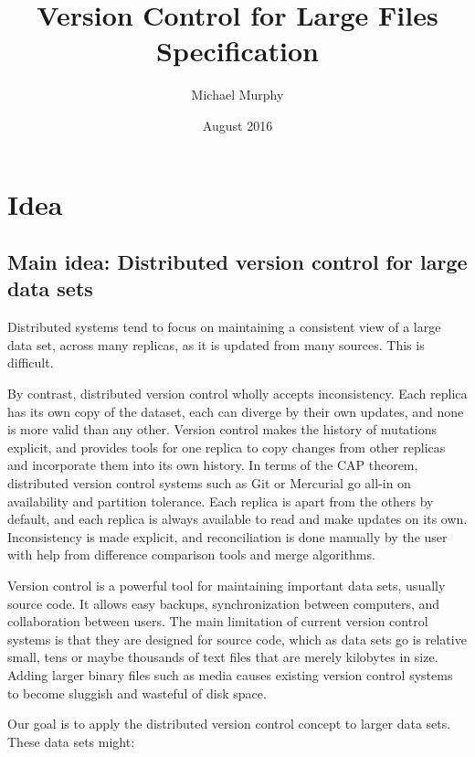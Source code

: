 \documentclass[a4paper]{article}
\begin{document}
\title{Version Control for Large Files\\
    Specification}
\author{Michael Murphy}
\date{August 2016}
\maketitle

\section{Idea}\label{idea}

\subsection{Main idea: Distributed version control for large data
sets}\label{main-idea-distributed-version-control-for-large-data-sets}

Distributed systems tend to focus on maintaining a consistent view of a large
data set, across many replicas, as it is updated from many sources.
This is difficult.

By contrast, distributed version control wholly accepts inconsistency.
Each replica has its own copy of the dataset, each can diverge by their own
updates, and none is more valid than any other.
Version control makes the history of mutations explicit, and provides tools for
one replica to copy changes from other replicas and incorporate them into its
own history.
In terms of the CAP theorem, distributed version control systems such as Git or
Mercurial go all-in on availability and partition tolerance.
Each replica is apart from the others by default, and each replica is always
available to read and make updates on its own.
Inconsistency is made explicit, and reconciliation is done manually by the user
with help from difference comparison tools and merge algorithms.

Version control is a powerful tool for maintaining important data sets, usually
source code.
It allows easy backups, synchronization between computers, and collaboration
between users.
The main limitation of current version control systems is that they are designed
for source code, which as data sets go is relative small, tens or maybe
thousands of text files that are merely kilobytes in size.
Adding larger binary files such as media causes existing version control systems
to become sluggish and wasteful of disk space.

Our goal is to apply the distributed version control concept to larger data
sets.
These data sets might:
\end{document}
